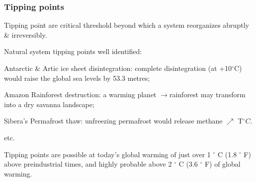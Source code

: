 \documentclass[xcolor=x11names,compress,aspectratio=169]{beamer}%
\makeatletter
\providecommand{\U}[1]{\protect\rule{.1in}{.1in}}
\newenvironment{stepitemizewithalert}{\begin{itemize}[<+-| alert@+>]}{\end{itemize} }
\renewenvironment{itemize}{\begin{compactitemize}[<+-| alert@+>]}{\end{compactitemize}}
\renewenvironment{stepitemizewithalert}{\begin{compactitemize}[<+-| alert@+>]}{\end{compactitemize}}
\renewenvironment{stepitemizewithalert}{\begin{itemize}}{\end{itemize}}
\makeatother
\begin{document}
\begin{frame}%
%

\frametitle{Tipping points}%


\begin{stepitemizewithalert}
\item Tipping point are critical threshold beyond which a system reorganizes
abruptly \& irreversibly.%
\vspace{1.5ex}%


\item Natural system tipping points well identified:

\begin{itemize}
\item \textsf{Antarctic \& Artic ice sheet disintegration:} complete
disintegration (at +10$%
{{}^\circ}%
$C) would raise the global sea levels by 53.3 metres;

\item \textsf{Amazon Rainforest destruction: }a warming planet $\rightarrow
$rainforest may transform into a dry savanna landscape;

\item \textsf{Sibera's Permafrost thaw:} unfreezing permafrost would release
methane $\nearrow$ T$%
{{}^\circ}%
C$.

\item etc.%
\vspace{1.5ex}%

\end{itemize}

\item Tipping points are possible at today's global warming of just over 1
${{}^\circ}$%
C (1.8
${{}^\circ}$%
F) above preindustrial times, and highly probable above 2
${{}^\circ}$%
C (3.6
${{}^\circ}$%
F) of global warming.
\end{stepitemizewithalert}

%

\transboxout
\end{frame}%
%
\end{document}
